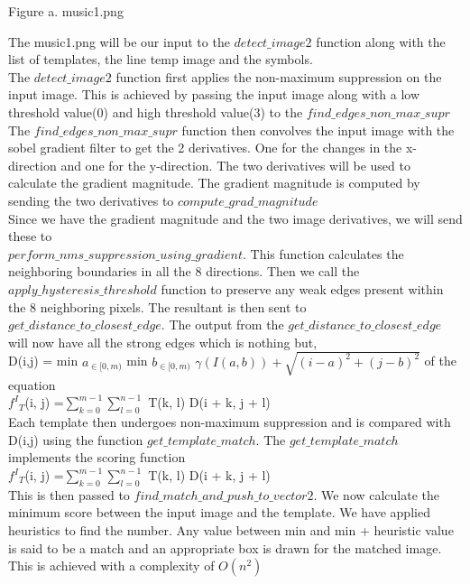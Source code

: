 \documentclass{article}
\begin{document}
\begin{enumerate}
\begin{center}
			Figure a. music1.png \\ 
		\end{center}   
		The music1.png will be our input to the $detect\_image2$ function along with the list of templates, the line temp image and the symbols. \\
		The $detect\_image2$ function first applies the non-maximum suppression on the input image. This is achieved by passing the input image along with a low threshold value(0) and high threshold value(3) to the $find\_edges\_non\_max\_supr$  \\
		The $find\_edges\_non\_max\_supr$ function then convolves the input image with the sobel gradient filter to get the 2 derivatives. One for the changes in the x-direction and one for the y-direction. The two derivatives will be used to calculate the gradient magnitude. The gradient magnitude is computed by sending the two derivatives to $compute\_grad\_magnitude$ \\
		Since we have the gradient magnitude and the two image derivatives, we will send these to \\ $perform\_nms\_suppression\_using\_gradient$. This function calculates the neighboring boundaries in all the 8 directions. Then we call the $apply\_hysteresis\_threshold$ function to preserve any weak edges present within the 8 neighboring pixels. The resultant is then sent to $get\_distance\_to\_closest\_edge$. The output from the $get\_distance\_to\_closest\_edge$ will now have all the strong edges which is nothing but, \\ D(i,j) = min $a_{\in [0,m)}$ min $b_{\in [0,m)}$ $\gamma (I(a,b)) + \sqrt{(i - a)^2 + (j - b)^2}$ of the equation \\ ${f^I}_T$(i, j) =$\sum\limits_{k=0}^{m-1} \sum\limits_{l=0}^{n-1}$ T(k, l) D(i + k, j + l)
		\\ Each template then undergoes non-maximum suppression and is compared with D(i,j) using the function $get\_template\_match$. The $get\_template\_match$ implements the scoring function \\ ${f^I}_T$(i, j) =$\sum\limits_{k=0}^{m-1} \sum\limits_{l=0}^{n-1}$ T(k, l) D(i + k, j + l)\\
		This is then passed to $find\_match\_and\_push\_to\_vector2$. We now calculate the minimum score between the input image and the template. We have applied heuristics to find the number. Any value between min and min + heuristic value is said to be a match and an appropriate box is drawn for the matched image. This is achieved with a complexity of $O(n^2)$ \\

\end{enumerate}
\end{document}
